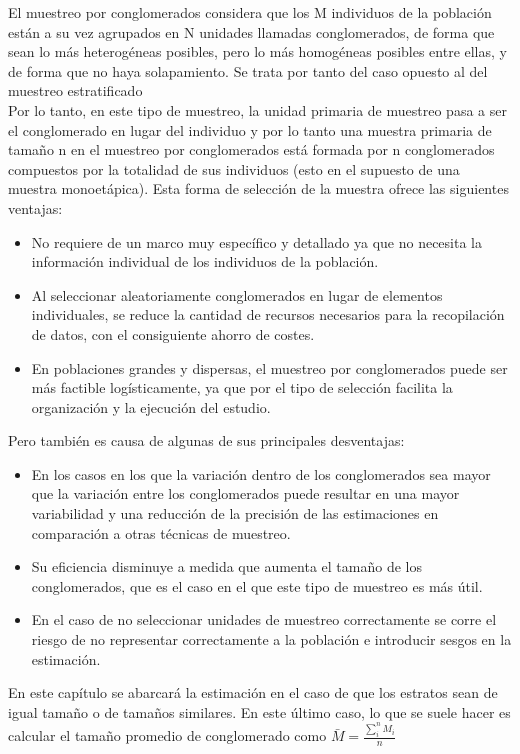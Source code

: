 El muestreo por conglomerados considera que los M individuos de la población están a su vez agrupados en N unidades llamadas conglomerados, de forma que sean lo más heterogéneas posibles, pero lo más homogéneas posibles entre ellas, y de forma que no haya solapamiento. Se trata por tanto del caso opuesto al del muestreo estratificado\\

Por lo tanto, en este tipo de muestreo, la unidad primaria de muestreo pasa a ser el conglomerado en lugar del individuo y por lo tanto una muestra primaria de tamaño n en el muestreo por conglomerados está formada por n conglomerados compuestos por la totalidad de sus individuos (esto en el supuesto de una muestra monoetápica). Esta forma de selección de la muestra ofrece las siguientes ventajas:\\

\begin{itemize}[label=$\bullet$]
    \item No requiere de un marco muy específico y detallado ya que no necesita la información individual de los individuos de la población.
    \item Al seleccionar aleatoriamente conglomerados en lugar de elementos individuales, se reduce la cantidad de recursos necesarios para la recopilación de datos, con el consiguiente ahorro de costes.
    \item En poblaciones grandes y dispersas, el muestreo por conglomerados puede ser más factible logísticamente, ya que por el tipo de selección facilita la organización y la ejecución del estudio.
\end{itemize}

Pero también es causa de algunas de sus principales desventajas:

\begin{itemize}[label=$\bullet$]
    \item En los casos en los que la variación dentro de los conglomerados sea mayor que la variación entre los conglomerados puede resultar en una mayor variabilidad y una reducción de la precisión de las estimaciones en comparación a otras técnicas de muestreo.
    \item Su eficiencia disminuye a medida que aumenta el tamaño de los conglomerados, que es el caso en el que este tipo de muestreo es más útil.
    \item En el caso de no seleccionar unidades de muestreo correctamente se corre el riesgo de no representar correctamente a la población e introducir sesgos en la estimación.
\end{itemize}
En este capítulo se abarcará la estimación en el caso de que los estratos sean de igual tamaño o de tamaños similares. En este último caso, lo que se suele hacer es calcular el tamaño promedio de conglomerado como $\bar{M} = \frac{\sum\limits_i^nM_i}{n}$


